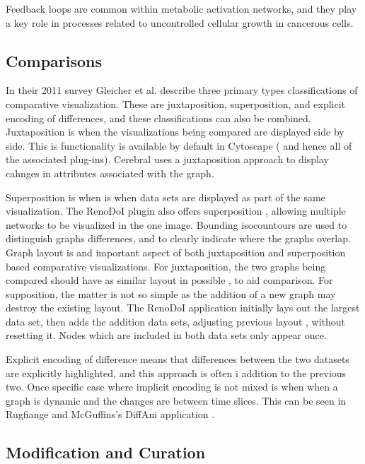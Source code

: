 \documentclass[journal]{vgtc}                %
\begin{document}
Feedback loops are common within metabolic activation networks, and they play a key role in processes related to uncontrolled cellular growth in cancerous cells.

\subsection{Comparisons}




In their 2011 survey Gleicher et al. \cite{Gleicher2011} describe three primary types  classifications of comparative visualization. 
These are  juxtaposition, superposition,  and explicit encoding of differences, and these classifications can also be combined.
Juxtaposition is when the visualizations being compared are displayed side by side.
This is functionality is available by default in Cytoscape ( and hence all of the associated plug-ins).
Cerebral uses a juxtaposition approach to display cahnges in attributes associated with the graph.

Superposition is when is when data sets are displayed as part of the same visualization.
The RenoDoI plugin also offers superposition , allowing multiple networks to be  visualized in the  one image. Bounding isocountours are used to distinguish graphs differences, and to clearly indicate where the graphs overlap.
Graph layout is and important aspect of both juxtaposition and superposition based comparative visualizations. 
For juxtaposition, the two graphs being compared should have as similar layout in possible , to aid comparison.
For supposition, the matter is not so simple as the addition of a new graph may destroy the existing layout.
The RenoDoI application\cite{Vehlow2015} initially lays out the largest data set, then adds the addition data sets, adjusting previous layout , without resetting it.
Nodes which are  included in both data sets only appear once.

Explicit encoding of difference  means that differences between the two datasets are explicitly highlighted, and this approach is often i addition to the previous two.
Once specific case where implicit encoding is not mixed is when when a graph is dynamic and the changes are between time slices. 
This can be seen in Rugfiange and McGuffins's DiffAni application \cite{Rufiange2013}.


\subsection{Modification and Curation}
\end{document}
